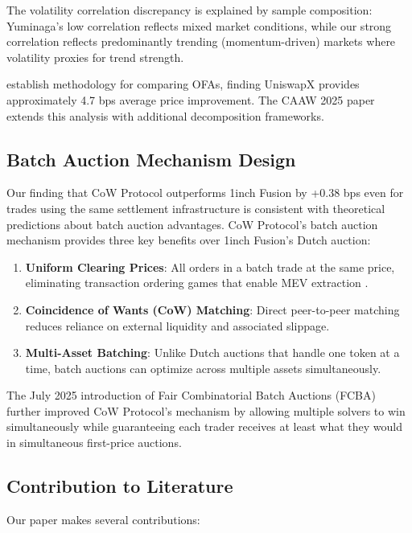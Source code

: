 \documentclass[12pt,a4paper]{article}
\begin{document}
The volatility correlation discrepancy is explained by sample composition: Yuminaga's low correlation reflects mixed market conditions, while our strong correlation reflects predominantly trending (momentum-driven) markets where volatility proxies for trend strength.

\cite{uniswap2024} establish methodology for comparing OFAs, finding UniswapX provides approximately 4.7 bps average price improvement. The CAAW 2025 paper extends this analysis with additional decomposition frameworks.

\subsection{Batch Auction Mechanism Design}

Our finding that CoW Protocol outperforms 1inch Fusion by +0.38 bps even for trades using the same settlement infrastructure is consistent with theoretical predictions about batch auction advantages. CoW Protocol's batch auction mechanism provides three key benefits over 1inch Fusion's Dutch auction:

\begin{enumerate}
    \item \textbf{Uniform Clearing Prices}: All orders in a batch trade at the same price, eliminating transaction ordering games that enable MEV extraction \citep{cow2025}.
    \item \textbf{Coincidence of Wants (CoW) Matching}: Direct peer-to-peer matching reduces reliance on external liquidity and associated slippage.
    \item \textbf{Multi-Asset Batching}: Unlike Dutch auctions that handle one token at a time, batch auctions can optimize across multiple assets simultaneously.
\end{enumerate}

The July 2025 introduction of Fair Combinatorial Batch Auctions (FCBA) \citep{canidio2024} further improved CoW Protocol's mechanism by allowing multiple solvers to win simultaneously while guaranteeing each trader receives at least what they would in simultaneous first-price auctions.

\subsection{Contribution to Literature}

Our paper makes several contributions:
\end{document}
